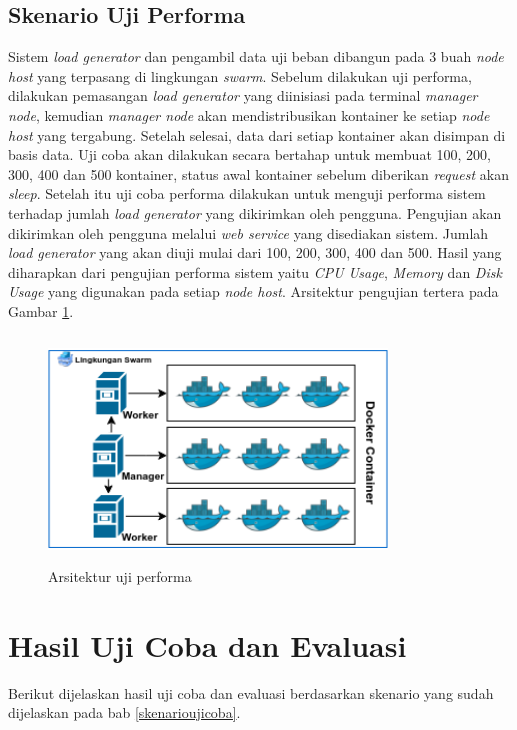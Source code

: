 	\subsection{Skenario Uji Performa}
		Sistem \textit{load generator} dan pengambil data uji beban dibangun pada 3 buah \textit{node host} yang terpasang di lingkungan \textit{swarm}.  Sebelum dilakukan uji performa, dilakukan pemasangan \textit{load generator} yang diinisiasi pada terminal \textit{manager node}, kemudian \textit{manager node} akan mendistribusikan kontainer ke setiap \textit{node host} yang tergabung. Setelah selesai, data dari setiap kontainer akan disimpan di basis data. Uji coba akan dilakukan secara bertahap untuk membuat 100, 200, 300, 400 dan 500 kontainer, status awal kontainer sebelum diberikan \textit{request} akan \textit{sleep}. Setelah itu uji coba performa dilakukan untuk menguji performa sistem terhadap jumlah \textit{load generator} yang dikirimkan oleh pengguna. Pengujian akan dikirimkan oleh pengguna melalui \textit{web service} yang disediakan sistem. Jumlah \textit{load generator} yang akan diuji mulai dari 100, 200, 300, 400 dan 500. Hasil yang diharapkan dari pengujian performa sistem yaitu \textit{CPU Usage}, \textit{Memory} dan \textit{Disk Usage} yang digunakan pada setiap \textit{node host}. Arsitektur pengujian tertera pada Gambar \ref{ujiperforma}.
		\begin{figure}[H]
			\centering
			\includegraphics[width=9cm,height=6cm]{Images/C-5/performa.png}
			\caption{Arsitektur uji performa}
			\label{ujiperforma}
		\end{figure}
	
	\section{Hasil Uji Coba dan Evaluasi}
		Berikut dijelaskan hasil uji coba dan evaluasi berdasarkan skenario yang sudah dijelaskan pada bab \ref{skenarioujicoba}.
		
